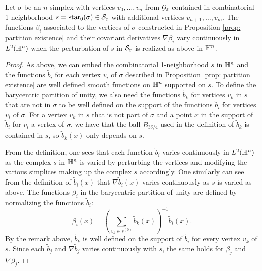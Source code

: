 \begin{lem} \label{lem: partition of unity continuous}
Let $\sigma$ be an $n$-simplex with vertices $v_0,\dots,v_n$ from $\mathcal G_\varepsilon$ contained in combinatorial 1-neighborhood $s = \operatorname{{\text{star}}}_0(\sigma) \in \mathcal S_\varepsilon$ with additional vertices $v_{n+1},\dots,v_m$.
The functions $\beta_i$ associated to the vertices of $\sigma$ constructed in Proposition \ref{prop: partition existence} and their covariant derivatives $\nabla \beta_i$ vary continuously in $L^2(\mathbb H^n)$ when the perturbation of $s$ in $\mathcal S_\varepsilon$ is realized as above in $\mathbb H^n$.
\end{lem}
\begin{proof}

As above, we can embed the combinatorial 1-neighborhood $s$ in $\mathbb H^n$ and the functions $\tilde b_i$ for each vertex $v_i$ of $\sigma$ described in Proposition \ref{prop: partition existence} are well defined smooth functions on $\mathbb H^n$ supported on $s$. To define the barycentric partition of unity, we also need the functions $\tilde b_k$ for vertices $v_k$ in $s$ that are not in $\sigma$ to be well defined on the support of the functions $\tilde b_i$ for vertices $v_i$ of $\sigma$.
For a vertex $v_k$ in $s$  that is not part of $\sigma$ and a point $x$ in the support of $\tilde b_i$ for $v_i$ a vertex of $\sigma$, we have that the ball $B_{3\delta/4}$ used in the definition of $\tilde b_k$ is contained in $s$, so $\tilde b_k(x)$ only depends on $s$.

From the definition, one sees that each function $\tilde b_i$ varies continuously in $L^2(\mathbb H^n)$ as the complex $s$ in $\mathbb H^n$ is varied by perturbing the vertices and modifying the various simplices making up the complex $s$ accordingly. One similarly can see from the definition of $\tilde b_i(x)$ that $\nabla \tilde b_i(x)$ varies continuously as $s$ is varied as above.
The functions $\beta_i$ in the barycentric partition of unity are defined by normalizing the functions $\tilde b_i$: $$\beta_i(x) = \left(\sum\limits_{v_k\in s^{(0)}} \tilde b_k (x)\right)^{-1} \tilde b_i (x) .$$ By the remark above, $\tilde b_k$ is well defined on the support of $\tilde b_i$ for every vertex $v_k$ of $s$. Since each $\tilde b_j$ and $\nabla \tilde b_j$ varies continuously with $s$, the same holds for $\beta_j$ and $\nabla \beta_j$.
\end{proof}

